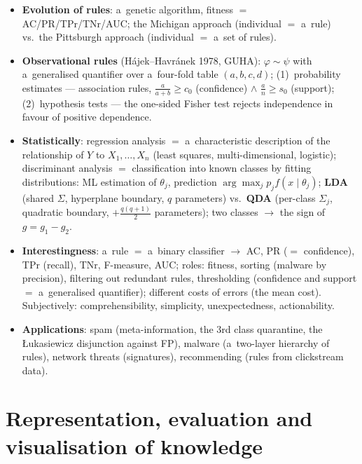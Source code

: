 \documentclass[11pt,a4paper]{article}
\theoremstyle{definition}
\begin{document}
\begin{itemize}
      splitting according to the information gain or the Gini index; pruning shortens
      the rules; generalised (oblique) splits reduce comprehensibility.
\item \textbf{Evolution of rules}: a~genetic algorithm, fitness $=$ AC/PR/TPr/TNr/AUC;
      the Michigan approach (individual $=$ a~rule) vs.\ the Pittsburgh approach
      (individual $=$ a~set of rules).
\item \textbf{Observational rules} (Hájek--Havránek 1978, GUHA): $\varphi\sim\psi$ with
      a~generalised quantifier over a~four-fold table $(a,b,c,d)$; (1)~probability
      estimates --- association rules, $\frac{a}{a+b}\ge c_0$ (confidence) $\wedge$
      $\frac{a}{n}\ge s_0$ (support); (2)~hypothesis tests --- the one-sided Fisher
      test rejects independence in favour of positive dependence.
\item \textbf{Statistically}: regression analysis $=$ a~characteristic description of
      the relationship of $Y$ to $X_1,\dots,X_n$ (least squares, multi-dimensional,
      logistic); discriminant analysis $=$ classification into known classes by
      fitting distributions: ML estimation of $\theta_j$, prediction
      $\arg\max_j p_j f(x\mid\theta_j)$; \textbf{LDA} (shared $\Sigma$, hyperplane
      boundary, $q$ parameters) vs.\ \textbf{QDA} (per-class $\Sigma_j$, quadratic
      boundary, $+\frac{q(q+1)}{2}$ parameters); two classes $\to$ the sign of
      $g=g_1-g_2$.
\item \textbf{Interestingness}: a~rule $=$ a~binary classifier $\to$ AC, PR
      ($=$ confidence), TPr (recall), TNr, F-measure, AUC; roles: fitness, sorting
      (malware by precision), filtering out redundant rules, thresholding (confidence
      and support $=$ a~generalised quantifier); different costs of errors (the mean
      cost). Subjectively: comprehensibility, simplicity, unexpectedness,
      actionability.
\item \textbf{Applications}: spam (meta-information, the 3rd class quarantine, the
      Łukasiewicz disjunction against FP), malware (a~two-layer hierarchy of rules),
      network threats (signatures), recommending (rules from clickstream data).
\end{itemize}
\newpage
\section{Representation, evaluation and visualisation of knowledge}
\label{sec:reprez}
\end{document}
